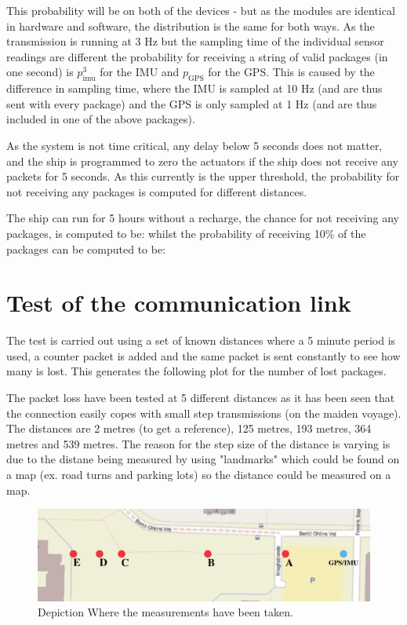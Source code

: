 This probability will be on both of the devices - but as the modules are identical in hardware and software, the distribution is the same for both ways. As the transmission is running at 3 Hz but the sampling time of the individual sensor readings are different the probability for receiving a string of valid packages (in one second) is $p_\text{imu}^{3}$ for the IMU and $p_\text{GPS}$ for the GPS. This is caused by the difference in sampling time, where the IMU is sampled at 10 Hz (and are thus sent with every package) and the GPS is only sampled at 1 Hz (and are thus included in one of the above packages). 

As the system is not time critical, any delay below 5 seconds does not matter, and the ship is programmed to zero the actuators if the ship does not receive any packets for 5 seconds. As this currently is the upper threshold, the probability for not receiving any packages is computed for different distances. 

The ship can run for 5 hours without a recharge, the chance for not receiving any packages, is computed to be: whilst the probability of receiving 10\% of the packages can be computed to be:

\section{Test of the communication link}

The test is carried out using a set of known distances where a 5 minute period is used, a counter packet is added and the same packet is sent constantly to see how many is lost. This generates the following plot for the number of lost packages. 

The packet loss have been tested at 5 different distances as it has been seen that the connection easily copes with small step transmissions (on the maiden voyage). The distances are 2 metres (to get a reference), 125 metres, 193 metres, 364 metres and 539 metres. The reason for the step size of the distance is varying is due to the distane being measured by using "landmarks" which could be found on a map (ex. road turns and parking lots) so the distance could be measured on a map.

\begin{figure}[htbp]
		\begin{center}
			\includegraphics[width=\textwidth]{img/measpoint}
			\caption{Depiction Where the measurements have been taken.}
			\label{fig:mpoint}
		\end{center}
\end{figure}

